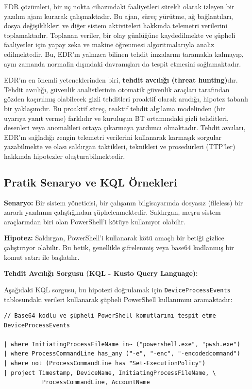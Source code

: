 EDR çözümleri, bir uç nokta cihazındaki faaliyetleri sürekli olarak izleyen bir yazılım ajanı kurarak çalışmaktadır. Bu ajan, süreç yürütme, ağ bağlantıları, dosya değişiklikleri ve diğer sistem aktiviteleri hakkında telemetri verilerini toplamaktadır. Toplanan veriler, bir olay günlüğüne kaydedilmekte ve şüpheli faaliyetler için yapay zeka ve makine öğrenmesi algoritmalarıyla analiz edilmektedir. Bu, EDR'ın yalnızca bilinen tehdit imzalarını taramakla kalmayıp, aynı zamanda normalin dışındaki davranışları da tespit etmesini sağlamaktadır.

EDR'ın en önemli yeteneklerinden biri, \textbf{tehdit avcılığı (threat hunting)}dır. Tehdit avcılığı, güvenlik analistlerinin otomatik güvenlik araçları tarafından gözden kaçırılmış olabilecek gizli tehditleri proaktif olarak aradığı, hipotez tabanlı bir yaklaşımdır. Bu proaktif süreç, reaktif tehdit algılama modelinden (bir uyarıya yanıt verme) farklıdır ve kuruluşun BT ortamındaki gizli tehditleri, desenleri veya anomalileri ortaya çıkarmaya yardımcı olmaktadır. Tehdit avcıları, EDR'ın sağladığı zengin telemetri verilerini kullanarak karmaşık sorgular yazabilmekte ve olası saldırgan taktikleri, teknikleri ve prosedürleri (TTP'ler) hakkında hipotezler oluşturabilmektedir.

\subsection{Pratik Senaryo ve KQL Örnekleri}
\textbf{Senaryo:} Bir sistem yöneticisi, bir çalışanın bilgisayarında dosyasız (fileless) bir zararlı yazılımın çalıştığından şüphelenmektedir. Saldırgan, meşru sistem araçlarından biri olan PowerShell'i kötüye kullanıyor olabilir.

\textbf{Hipotez:} Saldırgan, PowerShell'i kullanarak kötü amaçlı bir betiği gizlice çalıştırıyor olabilir. Bu betik, genellikle şifrelenmiş veya base64 kodlanmış bir komut satırı ile başlatılır.

\textbf{Tehdit Avcılığı Sorgusu (KQL - Kusto Query Language):}

Aşağıdaki KQL sorgusu, bu hipotezi doğrulamak için \texttt{DeviceProcessEvents} tablosundaki verileri kullanarak şüpheli PowerShell kullanımını aramaktadır:

\begin{verbatim}
// Base64 kodlu ve şüpheli PowerShell komutlarını tespit etme
DeviceProcessEvents

| where InitiatingProcessFileName in~ ("powershell.exe", "pwsh.exe")
| where ProcessCommandLine has_any ("-e", "-enc", "-encodedcommand")
| where not (ProcessCommandLine has "Set-ExecutionPolicy")
| project Timestamp, DeviceName, InitiatingProcessFileName, \
           ProcessCommandLine, AccountName
\end{verbatim}

